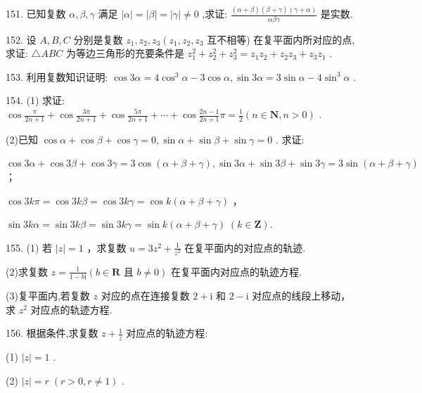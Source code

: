 \documentclass[10pt]{article}
\newcommand*\circled[1]{\tikz[baseline=(char.base)]{\node[shape=circle,draw,inner sep=1.5pt] (char) {\small #1};}}
\begin{document}
151. 已知复数 \(\alpha ,\beta ,\gamma\) 满足 \(\left| \alpha \right|  = \left| \beta \right|  = \left| \gamma \right|  \neq  0\) ,求证: \(\frac{\left( {\alpha  + \beta }\right) \left( {\beta  + \gamma }\right) \left( {\gamma  + \alpha }\right) }{\alpha \beta \gamma }\) 是实数.

152. 设 \(A,B,C\) 分别是复数 \({z}_{1},{z}_{2},{z}_{3}\left( {{z}_{1},{z}_{2},{z}_{3}}\right.\) 互不相等) 在复平面内所对应的点,求证: \(\bigtriangleup {ABC}\) 为等边三角形的充要条件是 \({z}_{1}^{2} + {z}_{2}^{2} + {z}_{3}^{2} = {z}_{1}{z}_{2} + {z}_{2}{z}_{3} + {z}_{3}{z}_{1}\) .

153. 利用复数知识证明: \(\cos {3\alpha } = 4{\cos }^{3}\alpha  - 3\cos \alpha ,\sin {3\alpha } = 3\sin \alpha  - 4{\sin }^{3}\alpha\) .

154. (1) 求证: \(\cos \frac{\pi }{{2n} + 1} + \cos \frac{3\pi }{{2n} + 1} + \cos \frac{5\pi }{{2n} + 1} + \cdots  + \cos \frac{{2n} - 1}{{2n} + 1}\pi  = \frac{1}{2}\left( {n \in  \mathbf{N},n > 0}\right)\) .

(2)已知 \(\cos \alpha  + \cos \beta  + \cos \gamma  = 0,\sin \alpha  + \sin \beta  + \sin \gamma  = 0\) . 求证:

 \circled{1}  \(\cos {3\alpha } + \cos {3\beta } + \cos {3\gamma } = 3\cos \left( {\alpha  + \beta  + \gamma }\right) ,\sin {3\alpha } + \sin {3\beta } + \sin {3\gamma } = 3\sin \left( {\alpha  + \beta  + \gamma }\right)\) ；

 \circled{2}  \(\cos {3k\pi } = \cos {3k\beta } = \cos {3k\gamma } = \cos k\left( {\alpha  + \beta  + \gamma }\right)\) ，

\(\sin {3k\alpha } = \sin {3k\beta } = \sin {3k\gamma } = \sin k\left( {\alpha  + \beta  + \gamma }\right) \;\left( {k \in  \mathbf{Z}}\right) .\)

155. (1) 若 \(\left| z\right|  = 1\) ，求复数 \(u = 3{z}^{2} + \frac{1}{{z}^{2}}\) 在复平面内的对应点的轨迹.

(2)求复数 \(z = \frac{1}{1 - b\mathrm{i}}\left( {b \in  \mathbf{R}\text{ 且 }b \neq  0}\right)\) 在复平面内对应点的轨迹方程.

(3)复平面内,若复数 \(z\) 对应的点在连接复数 \(2 + \mathrm{i}\) 和 \(2 - \mathrm{i}\) 对应点的线段上移动，求 \({z}^{2}\) 对应点的轨迹方程.

156. 根据条件,求复数 \(z + \frac{1}{z}\) 对应点的轨迹方程:

(1) \(\left| z\right|  = 1\) .

(2) \(\left| z\right|  = r\;\left( {r > 0,r \neq  1}\right)\) .
\end{document}
